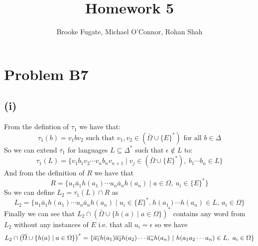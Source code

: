 \documentclass[12pt]{article}
\begin{document}
\pagestyle{plain}
\titleformat{\subsection}[runin]
  {\normalfont\large\bfseries}{\thesubsection}{1em}{}

\title{Homework 5}
\author{Brooke Fugate, Michael O'Connor, Rohan Shah}
\date{}

\maketitle

\section*{Problem B7}

\subsection*{(i)} From the defintion of $\tau_1$ we have that:
$$\tau_1(b)= v_1bv_2 \text{ such that } v_1,v_2 \in (\bar\Omega \cup \{E\}^*)
\text{ for all } b\in \Delta$$
So we can extend $\tau_1$ for languages $L \subseteq \Delta^*$ such that
$\epsilon \not\in L$ to:
$$\tau_1(L) = \{v_1b_1v_2\cdots v_nb_nv_{n+1} \mid
v_j \in (\bar\Omega \cup \{E\}^*),\ b_1\cdots b_n \in L\}$$
And from the definition of $R$ we have that
$$ R = \{u_1\bar a_1h(a_1)\cdots u_n\bar a_nh(a_n)
\mid a\in \Omega,\ u_i\in \{E\}^*\}$$
So we can define $L_2 = \tau_1(L) \cap R$ as
$$L_2 = \{u_1\bar a_1h(a_1)\cdots u_n\bar a_nh(a_n)
\mid u_i \in \{E\}^*.\ h(a_1)\cdots h(a_n) \in L,\ a_i\in \Omega\}$$
Finally we can see that $L_2 \cap (\bar\Omega\cup\{h(a) \mid a\in \Omega\})^*$
contains any word from $L_2$ without any instances of $E$ i.e. that all
$u_i = \epsilon$ so we have
$$L_2\cap \left(\ptb{\Omega}\cup \{h(a) \mid a\in\Omega\}\right)^*
=\{\ptb{a_1}h(a_1) \ptb{a_2}h(a_2)\cdots \ptb{a_n}h(a_n)\ |\ 
h(a_1a_2\cdots a_n)\in L,\ a_i\in \Omega\}$$
\end{document}
